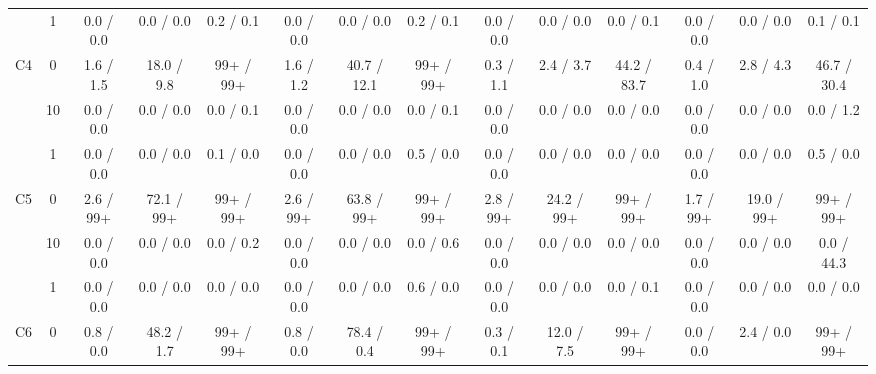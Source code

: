 \begin{table}
{\begin{tabular}[t]{cccccccccccccc}
\cmidrule{2-14}
 & 1 & 0.0 / 0.0 & 0.0 / 0.0 & 0.2 / 0.1 & 0.0 / 0.0 & 0.0 / 0.0 & 0.2 / 0.1 & 0.0 / 0.0 & 0.0 / 0.0 & 0.0 / 0.1 & 0.0 / 0.0 & 0.0 / 0.0 & 0.1 / 0.1\\
\cmidrule{2-14}
\multirow{-3}{*}{\centering\arraybackslash C4} & 0 & 1.6 / 1.5 & 18.0 / 9.8 & 99+ / 99+ & 1.6 / 1.2 & 40.7 / 12.1 & 99+ / 99+ & 0.3 / 1.1 & 2.4 / 3.7 & 44.2 / 83.7 & 0.4 / 1.0 & 2.8 / 4.3 & 46.7 / 30.4\\
\cmidrule{1-14}
 & 10 & 0.0 / 0.0 & 0.0 / 0.0 & 0.0 / 0.1 & 0.0 / 0.0 & 0.0 / 0.0 & 0.0 / 0.1 & 0.0 / 0.0 & 0.0 / 0.0 & 0.0 / 0.0 & 0.0 / 0.0 & 0.0 / 0.0 & 0.0 / 1.2\\
\cmidrule{2-14}
 & 1 & 0.0 / 0.0 & 0.0 / 0.0 & 0.1 / 0.0 & 0.0 / 0.0 & 0.0 / 0.0 & 0.5 / 0.0 & 0.0 / 0.0 & 0.0 / 0.0 & 0.0 / 0.0 & 0.0 / 0.0 & 0.0 / 0.0 & 0.5 / 0.0\\
\cmidrule{2-14}
\multirow{-3}{*}{\centering\arraybackslash C5} & 0 & 2.6 / 99+ & 72.1 / 99+ & 99+ / 99+ & 2.6 / 99+ & 63.8 / 99+ & 99+ / 99+ & 2.8 / 99+ & 24.2 / 99+ & 99+ / 99+ & 1.7 / 99+ & 19.0 / 99+ & 99+ / 99+\\
\cmidrule{1-14}
 & 10 & 0.0 / 0.0 & 0.0 / 0.0 & 0.0 / 0.2 & 0.0 / 0.0 & 0.0 / 0.0 & 0.0 / 0.6 & 0.0 / 0.0 & 0.0 / 0.0 & 0.0 / 0.0 & 0.0 / 0.0 & 0.0 / 0.0 & 0.0 / 44.3\\
\cmidrule{2-14}
 & 1 & 0.0 / 0.0 & 0.0 / 0.0 & 0.0 / 0.0 & 0.0 / 0.0 & 0.0 / 0.0 & 0.6 / 0.0 & 0.0 / 0.0 & 0.0 / 0.0 & 0.0 / 0.1 & 0.0 / 0.0 & 0.0 / 0.0 & 0.0 / 0.0\\
\cmidrule{2-14}
\multirow{-3}{*}{\centering\arraybackslash C6} & 0 & 0.8 / 0.0 & 48.2 / 1.7 & 99+ / 99+ & 0.8 / 0.0 & 78.4 / 0.4 & 99+ / 99+ & 0.3 / 0.1 & 12.0 / 7.5 & 99+ / 99+ & 0.0 / 0.0 & 2.4 / 0.0 & 99+ / 99+\\
\bottomrule
\end{tabular}
}
\end{table}
